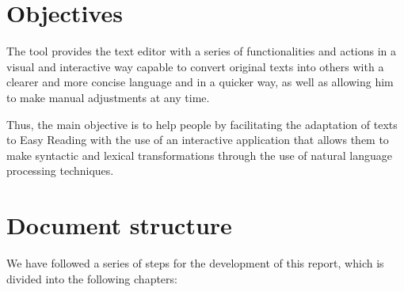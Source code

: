 \section{Objectives}
The tool provides the text editor with a series of functionalities and actions in a visual and interactive way capable to convert original texts into others with a clearer and more concise language and in a quicker way, as well as allowing him to make manual adjustments at any time. 

Thus, the main objective is to help people by facilitating the adaptation of texts to Easy Reading with the use of an interactive application that allows them to make syntactic and lexical transformations through the use of natural language processing techniques. 


\section{Document structure}


We have followed a series of steps for the development of this report, which is divided into the following chapters:

